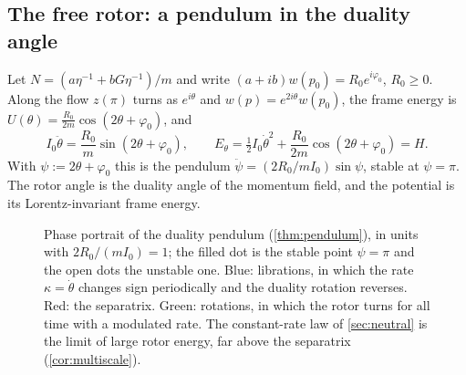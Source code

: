 \subsection{The free rotor: a pendulum in the duality angle}

\begin{theorem}
\label{thm:pendulum}
Let $N=(a\eta^{-1}+bG\eta^{-1})/m$ and write $(a+ib)w(p_0)=R_0e^{i\varphi_0}$, $R_0\ge0$. Along the flow $z(\pi)$ turns as $e^{i\theta}$ and
$w(p)=e^{2i\theta}w(p_0)$, the frame energy is $U(\theta)=\tfrac{R_0}{2m}\cos(2\theta+\varphi_0)$, and
\[
I_0\ddot\theta=\frac{R_0}m\sin(2\theta+\varphi_0),\qquad E_\theta=\tfrac12I_0\dot\theta^2+\frac{R_0}{2m}\cos(2\theta+\varphi_0)=H .
\]
With $\psi:=2\theta+\varphi_0$ this is the pendulum $\ddot\psi=(2R_0/mI_0)\sin\psi$, stable at $\psi=\pi$. The rotor angle is the duality angle of
the momentum field, and the potential is its Lorentz-invariant frame energy.
\end{theorem}

\begin{figure}[t]
\centering
{}
\caption{Phase portrait of the duality pendulum (\cref{thm:pendulum}), in units with $2R_0/(mI_0)=1$; the filled dot is the stable point
$\psi=\pi$ and the open dots the unstable one. Blue: librations, in which the rate $\kappa=\dot\theta$ changes sign periodically and the duality
rotation reverses. Red: the separatrix. Green: rotations, in which the rotor turns for all time with a modulated rate. The constant-rate law of \cref{sec:neutral} is the limit of large rotor energy, far above the
separatrix (\cref{cor:multiscale}).}
\label{fig:pendulum}
\end{figure}

